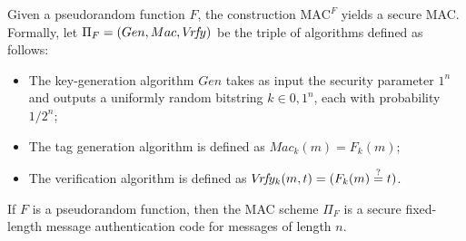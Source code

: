 Given a pseudorandom function $F$, the construction $\mathrm{MAC}^F$ yields a secure MAC. Formally, let $\Pi_F = (Gen, Mac, V\!r\!f\!y)$ be the triple of algorithms defined as follows:
\begin{itemize}
\item The key-generation algorithm $Gen$ takes as input the security parameter $1^n$ and outputs a uniformly random bitstring $k \in {0,1}^n$, each with probability $1/2^n$;
\item The tag generation algorithm is defined as $Mac_k(m) = F_k(m)$;
\item The verification algorithm is defined as $V\!r\!f\!y_k(m,t) = (F_k(m) \stackrel{?}{=} t)$.
\end{itemize}

\begin{theorem}\label{theorem:mac-security}
If $F$ is a pseudorandom function, then the MAC scheme $\Pi_F$ is a secure fixed-length message authentication code for messages of length $n$.
\end{theorem}
